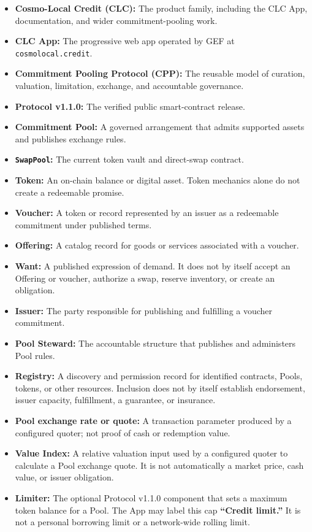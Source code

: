 \documentclass[11pt]{article}
\begin{document}
\begin{itemize}[leftmargin=*]
\item \textbf{Cosmo-Local Credit (CLC):} The product family, including the CLC App, documentation, and wider commitment-pooling work.
\item \textbf{CLC App:} The progressive web app operated by GEF at \texttt{cosmolocal.credit}.
\item \textbf{Commitment Pooling Protocol (CPP):} The reusable model of curation, valuation, limitation, exchange, and accountable governance.
\item \textbf{Protocol v1.1.0:} The verified public smart-contract release.
\item \textbf{Commitment Pool:} A governed arrangement that admits supported assets and publishes exchange rules.
\item \textbf{\texttt{SwapPool}:} The current token vault and direct-swap contract.
\item \textbf{Token:} An on-chain balance or digital asset. Token mechanics alone do not create a redeemable promise.
\item \textbf{Voucher:} A token or record represented by an issuer as a redeemable commitment under published terms.
\item \textbf{Offering:} A catalog record for goods or services associated with a voucher.
\item \textbf{Want:} A published expression of demand. It does not by itself accept an Offering or voucher, authorize a swap, reserve inventory, or create an obligation.
\item \textbf{Issuer:} The party responsible for publishing and fulfilling a voucher commitment.
\item \textbf{Pool Steward:} The accountable structure that publishes and administers Pool rules.
\item \textbf{Registry:} A discovery and permission record for identified contracts, Pools, tokens, or other resources. Inclusion does not by itself establish endorsement, issuer capacity, fulfillment, a guarantee, or insurance.
\item \textbf{Pool exchange rate or quote:} A transaction parameter produced by a configured quoter; not proof of cash or redemption value.
\item \textbf{Value Index:} A relative valuation input used by a configured quoter to calculate a Pool exchange quote. It is not automatically a market price, cash value, or issuer obligation.
\item \textbf{Limiter:} The optional Protocol v1.1.0 component that sets a maximum token balance for a Pool. The App may label this cap \textbf{``Credit limit.''} It is not a personal borrowing limit or a network-wide rolling limit.

\end{itemize}
\end{document}
